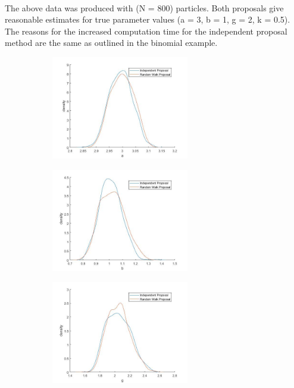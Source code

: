 \documentclass[12,fleqn]{article}
\theoremstyle{definition}
\theoremstyle{plain}
\begin{document}
\paragraph{}
The above data was produced with (N = 800) particles. Both proposals give reasonable estimates for true parameter values (a = 3, b = 1, g = 2, k = 0.5). The reasons for the increased computation time for the independent proposal method are the same as outlined in the binomial example.
\par

\begin{figure}[H]
\centering
\begin{subfigure}{6cm}
\centering
\includegraphics[width=6cm]{gandk_comparison_a.jpg}
\end{subfigure}
\begin{subfigure}{6cm}
\centering
\includegraphics[width=6cm]{gandk_comparison_b.jpg}
\end{subfigure}
\begin{subfigure}{6cm}
\centering
\includegraphics[width=6cm]{gandk_comparison_g.jpg}

\end{subfigure}
\end{figure}
\end{document}
